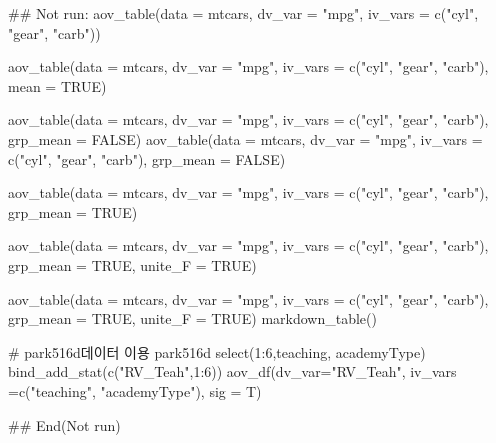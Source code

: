 \documentclass[a4paper]{book}
\begin{document}
\begin{Examples}
\begin{ExampleCode}

\#\# Not run: 
aov_table(data = mtcars, dv_var = "mpg",
iv_vars = c("cyl", "gear", "carb"))

aov_table(data = mtcars, dv_var = "mpg",
iv_vars = c("cyl", "gear", "carb"),
           mean = TRUE)

aov_table(data = mtcars, dv_var = "mpg",
iv_vars = c("cyl", "gear", "carb"), grp_mean = FALSE)
aov_table(data = mtcars, dv_var = "mpg",
iv_vars = c("cyl", "gear", "carb"), grp_mean = FALSE) %


aov_table(data = mtcars, dv_var = "mpg",
iv_vars = c("cyl", "gear", "carb"),
 grp_mean = TRUE)

aov_table(data = mtcars, dv_var = "mpg",
 iv_vars = c("cyl", "gear", "carb"),
 grp_mean = TRUE, unite_F = TRUE)

aov_table(data = mtcars, dv_var = "mpg",
iv_vars = c("cyl", "gear", "carb"),
 grp_mean = TRUE, unite_F = TRUE) %
  markdown_table()

# park516d데이터 이용
park516d %
  select(1:6,teaching, academyType) %
  bind_add_stat(c("RV_Teah",1:6)) %
  aov_df(dv_var="RV_Teah",
         iv_vars =c("teaching", "academyType"), sig = T)



## End(Not run)


\end{ExampleCode}
\end{Examples}
\end{document}
